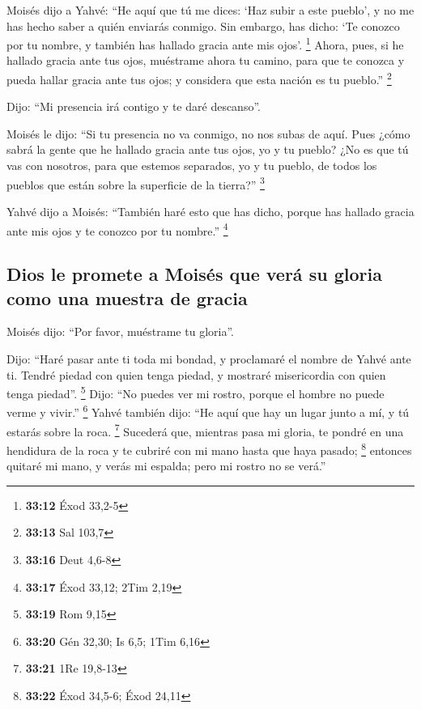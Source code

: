  Moisés dijo a Yahvé: ``He aquí que tú me dices: `Haz
subir a este pueblo', y no me has hecho saber a quién enviarás conmigo.
Sin embargo, has dicho: `Te conozco por tu nombre, y también has hallado
gracia ante mis ojos'. \footnote{\textbf{33:12} Éxod 33,2-5}
 Ahora, pues, si he hallado gracia ante tus ojos,
muéstrame ahora tu camino, para que te conozca y pueda hallar gracia
ante tus ojos; y considera que esta nación es tu pueblo.'' \footnote{\textbf{33:13}
  Sal 103,7}

 Dijo: ``Mi presencia irá contigo y te daré descanso''.

 Moisés le dijo: ``Si tu presencia no va conmigo, no nos
subas de aquí.  Pues ¿cómo sabrá la gente que he hallado
gracia ante tus ojos, yo y tu pueblo? ¿No es que tú vas con nosotros,
para que estemos separados, yo y tu pueblo, de todos los pueblos que
están sobre la superficie de la tierra?'' \footnote{\textbf{33:16} Deut
  4,6-8}

 Yahvé dijo a Moisés: ``También haré esto que has dicho,
porque has hallado gracia ante mis ojos y te conozco por tu nombre.''
\footnote{\textbf{33:17} Éxod 33,12; 2Tim 2,19}

\hypertarget{dios-le-promete-a-moisuxe9s-que-veruxe1-su-gloria-como-una-muestra-de-gracia}{%
\subsection{Dios le promete a Moisés que verá su gloria como una muestra
de
gracia}\label{dios-le-promete-a-moisuxe9s-que-veruxe1-su-gloria-como-una-muestra-de-gracia}}

 Moisés dijo: ``Por favor, muéstrame tu gloria''.

 Dijo: ``Haré pasar ante ti toda mi bondad, y proclamaré
el nombre de Yahvé ante ti. Tendré piedad con quien tenga piedad, y
mostraré misericordia con quien tenga piedad''. \footnote{\textbf{33:19}
  Rom 9,15}  Dijo: ``No puedes ver mi rostro, porque el
hombre no puede verme y vivir.'' \footnote{\textbf{33:20} Gén 32,30; Is
  6,5; 1Tim 6,16}  Yahvé también dijo: ``He aquí que hay
un lugar junto a mí, y tú estarás sobre la roca. \footnote{\textbf{33:21}
  1Re 19,8-13}  Sucederá que, mientras pasa mi gloria, te
pondré en una hendidura de la roca y te cubriré con mi mano hasta que
haya pasado; \footnote{\textbf{33:22} Éxod 34,5-6; Éxod 24,11}
 entonces quitaré mi mano, y verás mi espalda; pero mi
rostro no se verá.''

